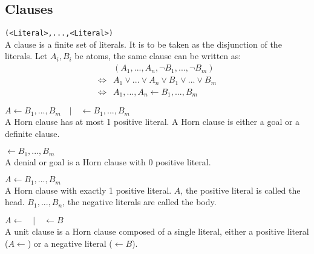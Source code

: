 \documentclass{article}
\begin{document}
\subsection{Clauses}
\begin{description}[leftmargin=0cm]
    \item[Clause:] \texttt{(<Literal>,...,<Literal>)} \\
    A clause is a finite set of literals. It is to be taken as the disjunction of the literals. Let $A_i, B_i$ be atoms, the same clause can be written as:
    \begin{eqnarray*}
         & (A_1, ..., A_n, \neg B_1, ..., \neg B_m) \\
    \iff & A_1 \lor ... \lor A_n \lor B_1 \lor ... \lor B_m \\
    \iff & A_1, ..., A_n \leftarrow B_1, ..., B_m
    \end{eqnarray*}
    \item[Horn clause:] $A \leftarrow B_1, ..., B_m \quad | \quad \leftarrow B_1, ..., B_m $ \\ A Horn clause has at most 1 positive literal. A Horn clause is either a goal or a definite clause.
    \item[Denial or goal:] $\leftarrow B_1, ..., B_m$ \\ A denial or goal is a Horn clause with 0 positive literal.
    \item[Definite clause:] $A \leftarrow B_1, ..., B_m$ \\ A Horn clause with exactly 1 positive literal. $A$, the positive literal is called the head. $B_1, ..., B_n$, the negative literals are called the body.
    \item[Unit clause:] $A \leftarrow \quad | \quad \leftarrow B$ \\ A unit clause is a Horn clause composed of a single literal, either a positive literal ($A \leftarrow$) or a negative literal ($\leftarrow B$).
\end{description} 
\end{document}
